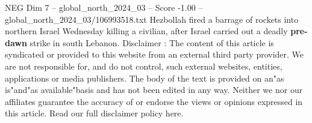 \begin{textsample}{NEG Dim 7 – global\_north\_2024\_03 – Score -1.00 – global\_north\_2024\_03/106993518.txt}
Hezbollah fired a barrage of rockets into northern Israel Wednesday killing a civilian, after Israel carried out a deadly \textbf{pre-dawn} strike in south Lebanon.
Disclaimer : The content of this article is syndicated or provided to this website from an external third party provider.
We are not responsible for, and do not control, such external websites, entities, applications or media publishers.
The body of the text is provided on an"as is"and"as available"basis and has not been edited in any way.
Neither we nor our affiliates guarantee the accuracy of or endorse the views or opinions expressed in this article.
Read our full disclaimer policy here.

\end{textsample}
